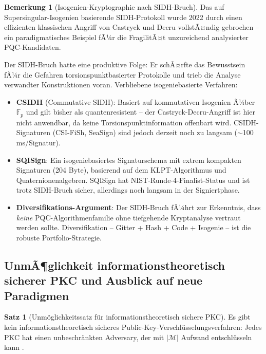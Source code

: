 ﻿\documentclass[a4paper,12pt]{article}
\theoremstyle{definition}
\newtheorem{bemerkung}{Bemerkung}[section]
\newtheorem{satz}{Satz}[section]
\begin{document}
\begin{bemerkung}[Isogenien-Kryptographie nach SIDH-Bruch]
Das auf Supersingular-Isogenien basierende SIDH-Protokoll \cite{JF11}
wurde 2022 durch einen effizienten klassischen Angriff von Castryck
und Decru \cite{CD22} vollstÃ¤ndig gebrochen -- ein paradigmatisches
Beispiel fÃ¼r die FragilitÃ¤t unzureichend analysierter PQC-Kandidaten.

Der SIDH-Bruch hatte eine produktive Folge: Er schÃ¤rfte das
Bewusstsein fÃ¼r die Gefahren torsionspunktbasierter Protokolle
und trieb die Analyse verwandter Konstruktionen voran.
Verbliebene isogeniebasierte Verfahren:
\begin{itemize}
  \item \textbf{CSIDH} (Commutative SIDH): Basiert auf kommutativen
    Isogenien Ã¼ber $\mathbb{F}_p$ und gilt bisher als quantenresistent
    -- der Castryck-Decru-Angriff ist hier nicht anwendbar,
    da keine Torsionspunktinformation offenbart wird.
    CSIDH-Signaturen (CSI-FiSh, SeaSign) sind jedoch derzeit
    noch zu langsam ($\sim$100\,ms/Signatur).
  \item \textbf{SQISign}: Ein isogeniebasiertes Signaturschema
    mit extrem kompakten Signaturen (204 Byte), basierend auf dem
    KLPT-Algorithmus und Quaternionenalgebren. SQISign hat
    NIST-Runde-4-Finalist-Status und ist trotz SIDH-Bruch sicher,
    allerdings noch langsam in der Signiertphase.
  \item \textbf{Diversifikations-Argument}:
    Der SIDH-Bruch fÃ¼hrt zur Erkenntnis, dass \emph{keine}
    PQC-Algorithmenfamilie ohne tiefgehende Kryptanalyse vertraut
    werden sollte. Diversifikation -- Gitter + Hash + Code + Isogenie
    -- ist die robuste Portfolio-Strategie.
\end{itemize}
\end{bemerkung}

\subsection{UnmÃ¶glichkeit informationstheoretisch sicherer PKC und Ausblick auf neue Paradigmen}

\begin{satz}[Unm\"oglichkeitssatz f\"ur informationstheoretisch sichere PKC]
Es gibt kein informationstheoretisch sicheres
Public-Key-Verschl\"usselungsverfahren: Jedes PKC hat einen
unbeschr\"ankten Adversary, der mit $|\mathcal{M}|$ Aufwand
entschl\"usseln kann \cite{Imp95}.
\end{satz}
\end{document}
